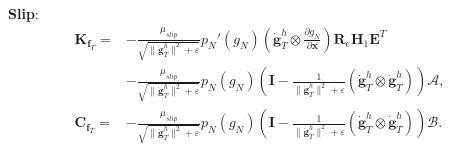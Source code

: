 \documentclass[3p]{elsarticle}
\newcommand{\vect}[1]{\boldsymbol{#1}}
\begin{document}
\noindent\textbf{Slip}:
\begin{align}
	\vect{K}_{\vect{f}_T}=&-\frac{\mu_{slip}}{\sqrt{\|\dot{\vect{g}}_T^h\|^2+\varepsilon}}p_N'(g_N)\left(\dot{\vect{g}}_T^h\otimes\frac{\partial g_N}{\partial\vect{x}}\right)\vect{R}_e\vect{H}_1\vect{E}^T\\
	&-\frac{\mu_{slip}}{\sqrt{\|\dot{\vect{g}}_T^h\|^2+\varepsilon}}p_N(g_N)\left(\vect{I}-\frac{1}{\|\dot{\vect{g}}_T^h\|^2+\varepsilon}(\dot{\vect{g}}_T^h\otimes\dot{\vect{g}}_T^h)\right)\vect{\mathcal{A}},\\
	\vect{C}_{\vect{f}_T}=&-\frac{\mu_{slip}}{\sqrt{\|\dot{\vect{g}}_T^h\|^2+\varepsilon}}p_N(g_N)\left(\vect{I}-\frac{1}{\|\dot{\vect{g}}_T^h\|^2+\varepsilon}(\dot{\vect{g}}_T^h\otimes\dot{\vect{g}}_T^h)\right)\vect{\mathcal{B}}.
\end{align}
\end{document}

